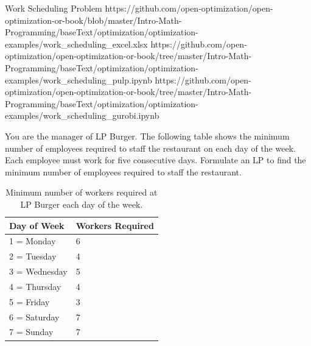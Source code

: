 \begin{examplewithallcode}{Work Scheduling Problem}
{https://github.com/open-optimization/open-optimization-or-book/blob/master/Intro-Math-Programming/baseText/optimization/optimization-examples/work_scheduling_excel.xlsx}
{https://github.com/open-optimization/open-optimization-or-book/tree/master/Intro-Math-Programming/baseText/optimization/optimization-examples/work_scheduling_pulp.ipynb}
{https://github.com/open-optimization/open-optimization-or-book/tree/master/Intro-Math-Programming/baseText/optimization/optimization-examples/work_scheduling_gurobi.ipynb}
\label{example:work-scheduling}

You are the manager of LP Burger. The following table shows the minimum number of employees required to staff the restaurant on each day of the week. Each employee must work for five consecutive days. Formulate an LP to find the minimum number of employees required to staff the restaurant.

\end{examplewithallcode}

\begin{table}[h!] \begin{center} \begin{tabular} {|l|l|} 
\hline Day of Week & Workers Required   \\ \hline
\hline  1 = Monday & 6  \\
\hline  2 = Tuesday & 4  \\
\hline  3 = Wednesday & 5  \\
\hline  4 = Thursday & 4  \\
\hline  5 = Friday & 3  \\
\hline  6 = Saturday & 7  \\
\hline  7 = Sunday & 7  \\
\hline \end{tabular} \end{center} \caption{Minimum number of workers required at LP Burger each day of the week.}\label{tab:modeling-linear-programming-tab03}%
\end{table}


